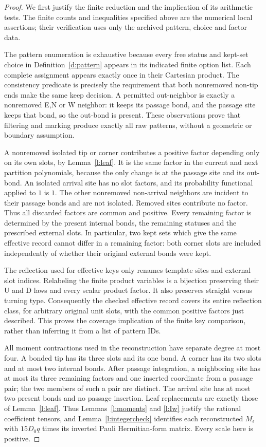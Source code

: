 \begin{proof}
We first justify the finite reduction and the implication of its
arithmetic tests. The finite counts and inequalities specified
above are the numerical local assertions; their verification uses
only the archived pattern, choice and factor data.

The pattern enumeration is exhaustive because every free status
and kept-set choice in Definition~\ref{d:pattern} appears in its
indicated finite option list. Each complete assignment appears
exactly once in their Cartesian product. The consistency predicate
is precisely the requirement that both nonremoved non-tip ends
make the same keep decision. A permitted out-neighbor is exactly
a nonremoved E,N or W neighbor: it keeps its passage bond, and
the passage site keeps that bond, so the out-bond is present.
These observations prove that filtering and marking produce
exactly all raw patterns, without a geometric or boundary assumption.

A nonremoved isolated tip or corner contributes a positive factor
depending only on its own slots, by Lemma~\ref{l:leaf}. It is
the same factor in the current and next partition polynomials,
because the only change is at the passage site and its out-bond.
An isolated arrival site has no slot factors, and its probability
functional applied to \(1\) is \(1\). The other nonremoved
non-arrival neighbors are incident to their passage bonds and
are not isolated. Removed sites contribute no factor. Thus all
discarded factors are common and positive. Every remaining factor
is determined by the present internal bonds, the remaining statuses
and the prescribed external slots. In particular, two kept sets
which give the same effective record cannot differ in a remaining
factor: both corner slots are included independently of whether
their original external bonds were kept.

The reflection used for effective keys only renames template sites
and external slot indices. Relabeling the finite product variables
is a bijection preserving their U and D laws and every scalar
product factor. It also preserves straight versus turning type.
Consequently the checked effective record covers its entire
reflection class, for arbitrary original unit slots, with the
common positive factors just described. This proves the coverage
implication of the finite key comparison, rather than inferring it
from a list of pattern IDs.

All moment contractions used in the reconstruction have separate
degree at most four. A bonded tip has its three slots and its one
bond. A corner has its two slots and at most two internal bonds.
After passage integration, a neighboring site has at most its
three remaining factors and one inserted coordinate from a passage
pair; the two members of such a pair are distinct. The arrival
site has at most two present bonds and no passage insertion.
Leaf replacements are exactly those of Lemma~\ref{l:leaf}.
Thus Lemmas~\ref{l:moments} and \ref{l:Iw} justify the rational
coefficient tensors, and Lemma~\ref{l:integercheck} identifies each
reconstructed \(M_\epsilon\) with \(15D_0q\) times its inverted
Pauli Hermitian-form matrix. Every scale here is positive.


\end{proof}
